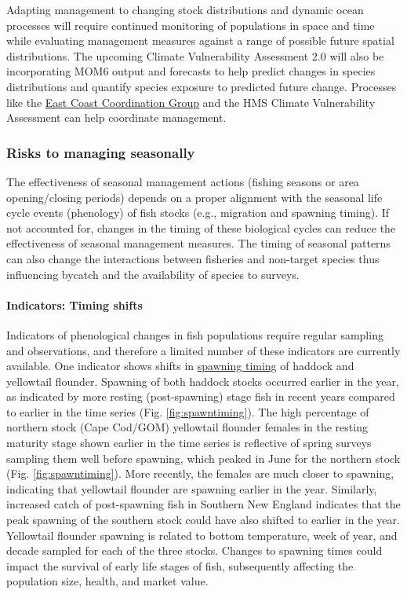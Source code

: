 \documentclass[
  10pt,
]{article}
\begin{document}
Adapting management to changing stock distributions and dynamic ocean processes will require continued monitoring of populations in space and time while evaluating management measures against a range of possible future spatial distributions. The upcoming Climate Vulnerability Assessment 2.0 will also be incorporating MOM6 output and forecasts to help predict changes in species distributions and quantify species exposure to predicted future change. Processes like the \href{https://www.mafmc.org/e3cg}{East Coast Coordination Group} and the HMS Climate Vulnerability Assessment can help coordinate management.

\subsubsection{Risks to managing seasonally}\label{risks-to-managing-seasonally}

The effectiveness of seasonal management actions (fishing seasons or area opening/closing periods) depends on a proper alignment with the seasonal life cycle events (phenology) of fish stocks (e.g., migration and spawning timing). If not accounted for, changes in the timing of these biological cycles can reduce the effectiveness of seasonal management measures. The timing of seasonal patterns can also change the interactions between fisheries and non-target species thus influencing bycatch and the availability of species to surveys.

\paragraph{Indicators: Timing shifts}\label{indicators-timing-shifts}

Indicators of phenological changes in fish populations require regular sampling and observations, and therefore a limited number of these indicators are currently available. One indicator shows shifts in \href{https://noaa-edab.github.io/catalog/spawn_timing.html}{spawning timing} of haddock and yellowtail flounder. Spawning of both haddock stocks occurred earlier in the year, as indicated by more resting (post-spawning) stage fish in recent years compared to earlier in the time series (Fig. \ref{fig:spawntiming}). The high percentage of northern stock (Cape Cod/GOM) yellowtail flounder females in the resting maturity stage shown earlier in the time series is reflective of spring surveys sampling them well before spawning, which peaked in June for the northern stock (Fig. \ref{fig:spawntiming}). More recently, the females are much closer to spawning, indicating that yellowtail flounder are spawning earlier in the year. Similarly, increased catch of post-spawning fish in Southern New England indicates that the peak spawning of the southern stock could have also shifted to earlier in the year. Yellowtail flounder spawning is related to bottom temperature, week of year, and decade sampled for each of the three stocks. Changes to spawning times could impact the survival of early life stages of fish, subsequently affecting the population size, health, and market value.
\end{document}
